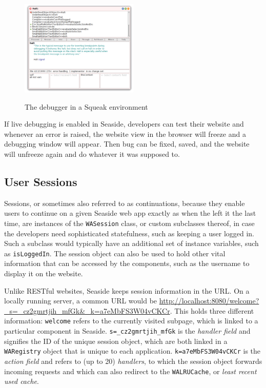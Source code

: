 \documentclass[a4paper,12pt,pagesize,headsepline,oribibl,titlepage]{scrartcl}
\begin{document}
\begin{figure}[h]
\begin{center}
\includegraphics*[width=0.5\textwidth]{images/debugger.png}\\
\caption{The debugger in a Squeak environment}
\label{abb:debug}
\end{center}
\end{figure}

If live debugging is enabled in Seaside, developers can test their website and whenever an error is raised, the website view in the browser will freeze and a debugging window will appear. Then bug can be fixed, saved, and the website will unfreeze again and do whatever it was supposed to.

\subsection{User Sessions}

Sessions, or sometimes also referred to as continuations, because they enable users to continue on a given Seaside web app  exactly as when the left it the last time, are instances of the \texttt{WASession} class, or custom subclasses thereof, in case the developers need sophisticated statefulness, such as keeping a user logged in. Such a subclass would typically have an additional set of instance variables, such as \texttt{isLoggedIn}. The session object can also be used to hold other vital information that can be accessed by the components, such as the username to display it on the website. \cite{ducasse2010dynamic}

Unlike RESTful websites, Seaside keeps session information in the URL. On a locally running server, a common URL would be \url{http://localhost:8080/welcome?_s=_cz2gmrtjih_mfGk&_k=a7eMbFS3W04vCKCr}. This holds three different information: \texttt{welcome} refers to the currently visited subpage, which is linked to a particular component in Seaside. \texttt{s=\_cz2gmrtjih\_mfGk} is the \emph{handler field} and signifies the ID of the unique session object, which are both linked in a \texttt{WARegistry} object that is unique to each application. \texttt{k=a7eMbFS3W04vCKCr} is the \emph{action field} and refers to (up to 20) \emph{handlers}, to which the session object forwards incoming requests and which can also redirect to the \texttt{WALRUCache}, or \emph{least recent used cache}. \cite{perscheid2008introduction}
\end{document}
